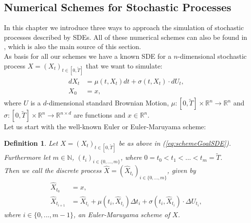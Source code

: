 \documentclass[12pt]{article}
\newtheorem{definition}[theorem]{Definition}
\begin{document}
	\subsection{Numerical Schemes for Stochastic Processes}
	In this chapter we introduce three ways to approach the simulation of stochastic processes described by SDEs. All of these numerical schemes can also be found in \cite{kloedenSchemes}, which is also the main source of this section.\\
	As basis for all our schemes we have a known SDE for a $n$-dimensional stochastic process $X=(X_t)_{t\in [0,\tilde{T}]}$ that we want to simulate:
	\begin{align}
		\begin{aligned}\label{eq:schemeGoalSDE}
		dX_t &= \mu(t, X_t)dt + \sigma(t, X_t) \cdot dU_t,\\
		X_0 &= x,
		\end{aligned}
	\end{align}
	where $U$ is a $d$-dimensional standard Brownian Motion, $\mu: [0,\tilde{T}] \times \mathbb{R}^n \rightarrow \mathbb{R}^n$ and $\sigma: [0,\tilde{T}] \times \mathbb{R}^n \rightarrow \mathbb{R}^{n \times d}$ are functions and $x \in \mathbb{R}^n$.\\
	Let us start with the well-known Euler or Euler-Maruyama scheme:
	\begin{definition}
		Let $X=(X_t)_{t\in [0,\tilde{T}]}$ be as above in (\ref{eq:schemeGoalSDE}).\\
		Furthermore let $m \in \mathbb{N}$, $(t_i)_{i\in \{0, ..., m\}}$, where $0=t_0 < t_1 < ... < t_m=\tilde{T}$.\\
		Then we call the discrete process $\hat{X} = (\hat{X}_{t_i})_{i \in \{0, ..., m\}}$, given by
		\begin{align*}
			\hat{X}_{t_0} &= x,\\
			\hat{X}_{t_{i+1}} &= \hat{X}_{t_{i}} + \mu(t_i, \hat{X}_{t_{i}})\Delta t_i + \sigma(t_i, \hat{X}_{t_{i}}) \cdot \Delta U_{t_i},
		\end{align*}
		where $i \in \{0, ..., m-1\}$, an \emph{Euler-Maruyama scheme of $X$}.
	\end{definition}
	
\end{document}
